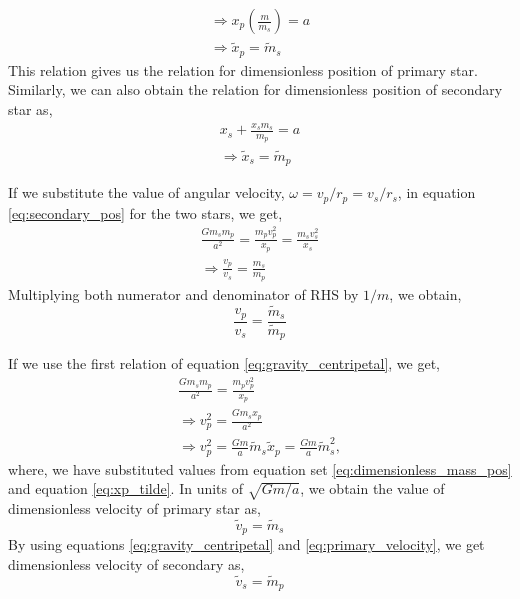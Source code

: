 \documentclass[a4paper]{article}
\begin{document}
\begin{enumerate} [label*=\textbf{(\alph*)}]
\begin{equation}
\begin{gathered}
						\Rightarrow x_p \left( \frac{m}{m_s}\right) = a \\
						\Rightarrow \tilde{x}_p = \tilde{m}_s 
					\end{gathered}
					\label{eq:xp_tilde}
				\end{equation}
				This relation gives us the relation for dimensionless position of primary star. Similarly, we can also obtain the relation for dimensionless position of secondary star as,
				\begin{equation}
					\begin{gathered}
						x_s + \frac{x_s m_s}{m_p} = a \\
						\Rightarrow \tilde{x}_s = \tilde{m}_p
					\end{gathered}
					\label{eq:xs_tilde}
				\end{equation}
				
				If we substitute the value of angular velocity, \(\omega =  v_p/r_p = v_s/r_s\), in equation \ref{eq:secondary_pos} for the two stars, we get,
				\begin{equation}
					\begin{gathered}
						\frac{G m_s m_p}{a^2} = \frac{m_p v_p^2}{x_p} = \frac{m_s v_s^2}{x_s} \\
						\Rightarrow \frac{v_p}{v_s} = \frac{m_s}{m_p}
					\end{gathered}
					\label{eq:gravity_centripetal}
				\end{equation}
				Multiplying both numerator and denominator of RHS by \(1/m\), we obtain,
				\begin{equation}
					\frac{v_p}{v_s} = \frac{\tilde{m}_s}{\tilde{m}_p}
					\label{eq:velocity_mass_relation}
				\end{equation}
				
				If we use the first relation of equation \ref{eq:gravity_centripetal}, we get,
				\begin{equation}
					\begin{gathered}
						\frac{G m_s m_p}{a^2} = \frac{m_p v_p^2}{x_p} \\
						\Rightarrow v_p^2 = \frac{G m_s x_p}{a^2} \\
						\Rightarrow v_p^2 = \frac{Gm}{a} \tilde{m}_s \tilde{x}_p = \frac{Gm}{a} \tilde{m}_s^2,
					\end{gathered}
				\end{equation}
				where, we have substituted values from equation set \ref{eq:dimensionless_mass_pos} and equation \ref{eq:xp_tilde}. In units of \(\sqrt{Gm/a}\), we obtain the value of dimensionless velocity of primary star as,
					\begin{equation}
						\tilde{v}_p = \tilde{m}_s
						\label{eq:primary_velocity}
					\end{equation}
				By using equations \ref{eq:gravity_centripetal} and \ref{eq:primary_velocity}, we get dimensionless velocity of secondary as,
					\begin{equation}
						\tilde{v}_s = \tilde{m}_p
						\label{eq:secondary_velocity}
					\end{equation}
				

\end{enumerate}
\end{document}

